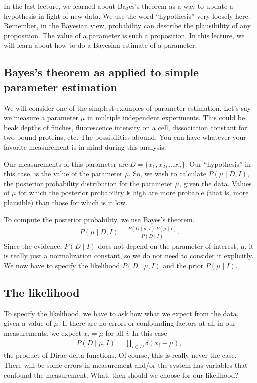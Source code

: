 In the last lecture, we learned about Bayes's theorem as a way to
update a hypothesis in light of new data.  We use the word
``hypothesis'' very loosely here.  Remember, in the Bayesian view,
probability can describe the plausibility of any proposition.  The
value of a parameter is such a proposition.  In this lecture, we will
learn about how to do a Bayesian estimate of a parameter.


\subsection{Bayes's theorem as applied to simple parameter estimation}
We will consider one of the simplest examples of parameter estimation.
Let's say we measure a parameter $\mu$ in multiple independent
experiments.  This could be beak depths of finches, fluorescence
intensity on a cell, dissociation constant for two bound proteins,
etc.  The possibilities abound.  You can have whatever your favorite
measurement is in mind during this analysis.

Our measurements of this parameter are $D = \{x_1, x_2, \ldots x_n\}$.
Our ``hypothesis'' in this case, is the value of the parameter $\mu$.
So, we wish to calculate $P(\mu \mid D, I)$, the posterior probability
distribution for the parameter $\mu$, given the data.  Values of $\mu$
for which the posterior probability is high are more probable (that
is, more plausible) than those for which is it low.

To compute the posterior probability, we use Bayes's theorem.
\begin{align}
P(\mu\mid D, I) = \frac{P(D\mid \mu, I)\,P(\mu \mid I)}{P(D\mid I)}.
\end{align}
Since the evidence, $P(D\mid I)$ does not depend on the parameter of
interest, $\mu$, it is really just a normalization constant, so we do
not need to consider it explicitly.  We now have to specify the
likelihood $P(D\mid \mu, I)$ and the prior $P(\mu \mid I)$.


\subsection{The likelihood}
To specify the likelihood, we have to ask how what we expect from the
data, given a value of $\mu$.  If there are no errors or confounding
factors at all in our measurements, we expect $x_i = \mu$ for all $i$.
In this case
\begin{align}
P(D\mid \mu, I) = \prod_{i\in D}\delta(x_i - \mu),
\end{align}
the product of Dirac delta functions.  Of course, this is really never
the case.  There will be some errors in measurement and/or the system
has variables that confound the measurement.  What, then should we
choose for our likelihood?

